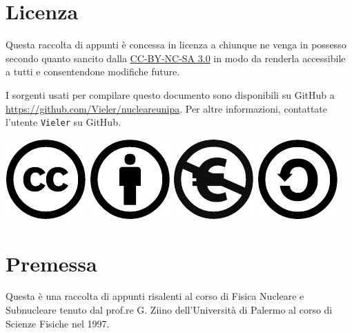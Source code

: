 \chapter{Licenza}
Questa raccolta di appunti è concessa in licenza a chiunque ne venga in possesso
secondo quanto sancito dalla \href{http://creativecommons.org/licenses/by-nc-sa/3.0/it/}{CC-BY-NC-SA 3.0}
in modo da renderla accessibile a tutti e consentendone modifiche future.

I sorgenti usati per compilare questo documento sono disponibili su GitHub a
\url{https://github.com/Vieler/nucleareunipa}. Per altre informazioni,
contattate l'utente \verb!Vieler! su GitHub.
\begin{flushright}
\includegraphics[scale=1]{img/cc}
\includegraphics[scale=1]{img/by}
\includegraphics[scale=1]{img/nc-eu}
\includegraphics[scale=1]{img/sa}
\end{flushright}
\chapter{Premessa}
\vfill
Questa è una raccolta di appunti risalenti al corso di Fisica Nucleare e
Subnucleare tenuto dal prof.re G. Ziino dell'Università di Palermo al corso di
Scienze Fisiche nel 1997.

